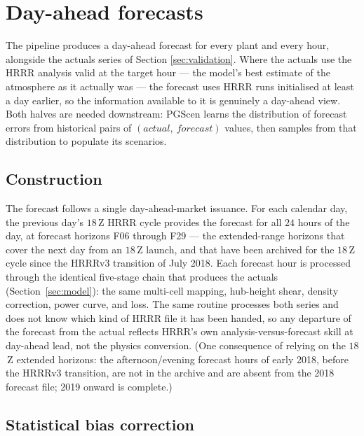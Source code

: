 \documentclass[11pt]{article}
\begin{document}
\section{Day-ahead forecasts}
\label{sec:forecast}

The pipeline produces a day-ahead forecast for every plant and every
hour, alongside the actuals series of Section \ref{sec:validation}.
Where the actuals use the HRRR analysis valid at the target hour ---
the model's best estimate of the atmosphere as it actually was --- the
forecast uses HRRR runs initialised at least a day earlier, so the
information available to it is genuinely a day-ahead view. Both halves
are needed downstream: PGScen learns the distribution of forecast
errors from historical pairs of $(actual,\ forecast)$ values, then
samples from that distribution to populate its scenarios.

\subsection{Construction}

The forecast follows a single day-ahead-market issuance. For each
calendar day, the previous day's $18$\,Z HRRR cycle provides the
forecast for all $24$ hours of the day, at forecast horizons F06 through
F29 --- the extended-range horizons that cover the next day from an
$18$\,Z launch, and that have been archived for the $18$\,Z cycle since
the HRRRv3 transition of July 2018. Each forecast hour is processed
through the identical five-stage chain that produces the actuals
(Section~\ref{sec:model}): the same multi-cell mapping, hub-height
shear, density correction, power curve, and loss. The same routine
processes both series and does not know which kind of HRRR file it has
been handed, so any departure of the forecast from the actual reflects
HRRR's own analysis-versus-forecast skill at day-ahead lead, not the
physics conversion. (One consequence of relying on the $18$\,Z extended
horizons: the afternoon/evening forecast hours of early 2018, before the
HRRRv3 transition, are not in the archive and are absent from the 2018
forecast file; 2019 onward is complete.)

\subsection{Statistical bias correction}
\end{document}
